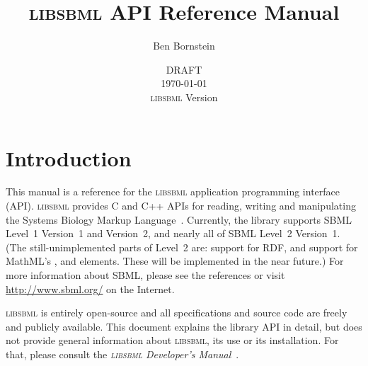 \documentclass{sbmlmanual}
\newcommand{\libsbml}{\textsc{libsbml}}
\begin{document}

\title{\textsc{libsbml} API Reference Manual}

\author{Ben Bornstein}


\address{The SBML Team\\
  Control and Dynamical Systems, MC 107-81\\
  California Institute of Technology, Pasadena, CA 91125, USA\\[2pt]
  {\url{http://www.sbml.org/}}}

\date{DRAFT\\[5pt]
  \today{}\\[10pt]%
  \hspace*{-1ex}\libsbml{} Version %
}

\maketitlepage


\section{Introduction}
\label{sec:quickstart-unix}

This manual is a reference for the \libsbml{} application programming
interface (API).  \libsbml{} provides C and C++ APIs for reading, writing
and manipulating the Systems Biology Markup
Language~\citep[SBML;][]{hucka_2001b,hucka_2003,finney_2003b}.  Currently,
the library supports SBML Level~1 Version~1 and Version~2, and nearly all
of SBML Level~2 Version~1.  (The still-unimplemented parts of Level~2 are:
support for RDF, and support for MathML's ,
 and  elements.  These will be
implemented in the near future.)  For more information about SBML, please
see the references or visit \url{http://www.sbml.org/} on the Internet.

\libsbml{} is entirely open-source and all specifications and source code
are freely and publicly available.  This document explains the library API
in detail, but does not provide general information about \libsbml{}, its
use or its installation.  For that, please consult the
\emph{\libsbml{} Developer's Manual}~\citep{bornstein_2004}.
\end{document}
